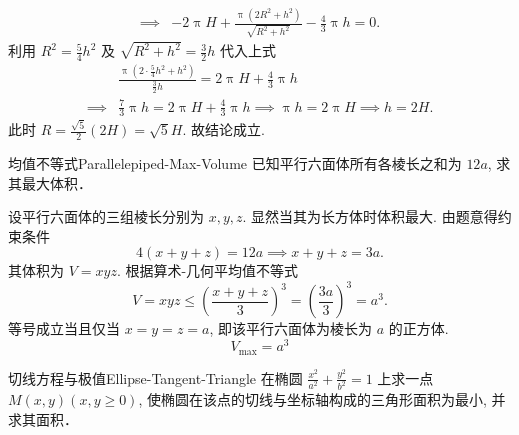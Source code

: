 \begin{myproof}
\begin{equation}
\begin{aligned}
            \implies & -2 \uppi H + \frac{\uppi (2R^2 + h^2)}{\sqrt{R^2 + h^2}} - \frac{4}{3} \uppi h = 0 .
        \end{aligned}
    \end{equation}
    利用 $R^2 = \frac{5}{4}h^2$ 及 $\sqrt{R^2 + h^2} = \frac{3}{2}h$ 代入上式
    \begin{equation}
        \begin{aligned}
                     & \frac{\uppi \left( 2 \cdot \frac{5}{4}h^2 + h^2 \right)}{\frac{3}{2}h} = 2 \uppi H + \frac{4}{3} \uppi h \\
            \implies & \frac{7}{3} \uppi h = 2 \uppi H + \frac{4}{3} \uppi h \implies \uppi h = 2 \uppi H \implies h = 2H .
        \end{aligned}
    \end{equation}
    此时 $R = \frac{\sqrt{5}}{2}(2H) = \sqrt{5}H$. 故结论成立.
\end{myproof}

\begin{problem}{均值不等式}{Parallelepiped-Max-Volume}
    已知平行六面体所有各棱长之和为 $12a$, 求其最大体积．
\end{problem}

\begin{solution}
    设平行六面体的三组棱长分别为 $x, y, z$. 显然当其为长方体时体积最大.
    由题意得约束条件
    \begin{equation}
        4(x + y + z) = 12a \implies x + y + z = 3a .
    \end{equation}
    其体积为 $V = xyz$. 根据算术-几何平均值不等式
    \begin{equation}
        V = xyz \le \left( \frac{x + y + z}{3} \right)^3 = \left( \frac{3a}{3} \right)^3 = a^3 .
    \end{equation}
    等号成立当且仅当 $x = y = z = a$, 即该平行六面体为棱长为 $a$ 的正方体.
    \begin{equation}
        \boxed{V_{\max} = a^3}
    \end{equation}
\end{solution}

\begin{problem}{切线方程与极值}{Ellipse-Tangent-Triangle}
    在椭圆 $\frac{x^2}{a^2} + \frac{y^2}{b^2} = 1$ 上求一点 $M(x, y) (x, y \ge 0)$, 使椭圆在该点的切线与坐标轴构成的三角形面积为最小, 并求其面积．
\end{problem}

